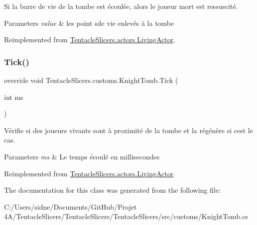 Si la barre de vie de la tombe est écoulée, alors le joueur mort est ressuscité. 


\begin{DoxyParams}{Parameters}
{\em value} & les point sde vie enlevés à la tombe \\
\hline
\end{DoxyParams}


Reimplemented from \hyperlink{class_tentacle_slicers_1_1actors_1_1_living_actor_a14c215128afe9c82bb57237501f41640}{Tentacle\+Slicers.\+actors.\+Living\+Actor}.

\mbox{\label{class_tentacle_slicers_1_1customs_1_1_knight_tomb_a2494934e67c63f70623b7ff47a4248f8}} 
\subsubsection{\texorpdfstring{Tick()}{Tick()}}
{\footnotesize\ttfamily override void Tentacle\+Slicers.\+customs.\+Knight\+Tomb.\+Tick (\begin{DoxyParamCaption}\item[{int}]{ms }\end{DoxyParamCaption})\hspace{0.3cm}{\ttfamily [virtual]}}



Vérifie si des joueurs vivants sont à proximité de la tombe et la régénère si c\textquotesingle{}est le cas. 


\begin{DoxyParams}{Parameters}
{\em ms} & Le temps écoulé en millisecondes \\
\hline
\end{DoxyParams}


Reimplemented from \hyperlink{class_tentacle_slicers_1_1actors_1_1_living_actor_a1697e3d67782b4df99e48a333a138935}{Tentacle\+Slicers.\+actors.\+Living\+Actor}.



The documentation for this class was generated from the following file\+:\begin{DoxyCompactItemize}
\item 
C\+:/\+Users/sidne/\+Documents/\+Git\+Hub/\+Projet 4\+A/\+Tentacle\+Slicers/\+Tentacle\+Slicers/\+Tentacle\+Slicers/src/customs/Knight\+Tomb.\+cs\end{DoxyCompactItemize}
